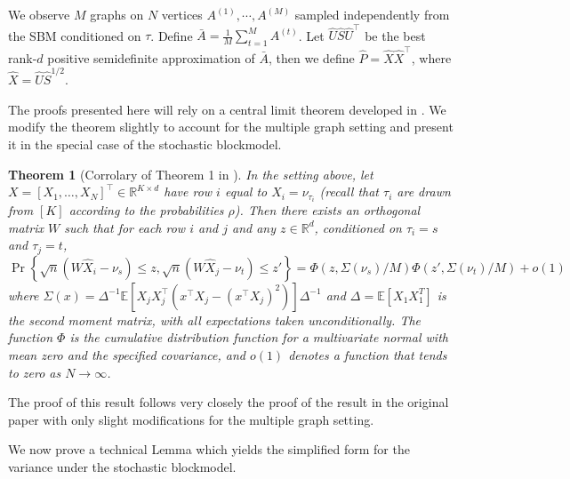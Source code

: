 \documentclass[10pt,letterpaper]{article}
\newtheorem{theorem}[fact]{Theorem}
\renewcommand{\Re}{\mathbb{R}}
\newcommand{\Ex}{\mathbb{E}}
\renewcommand{\hat}{\widehat}
\begin{document}
We observe $M$ graphs on $N$ vertices $A^{(1)}, \cdots, A^{(M)}$ sampled independently from the SBM conditioned on $\tau$.
Define $\bar{A} = \frac{1}{M} \sum_{t=1}^M A^{(t)}$. Let $\hat{U} \hat{S} \hat{U}^{\top}$ be the best rank-$d$ positive semidefinite approximation of $\bar{A}$, then we define $\hat{P} = \hat{X} \hat{X}^{\top}$, where $\hat{X} = \hat{U} \hat{S}^{1/2}$.




The proofs presented here will rely on a central limit theorem developed in \citet{athreya2013limit}. 
We modify the theorem slightly to account for the multiple graph setting and present it in the special case of the stochastic blockmodel.

\begin{theorem}[Corrolary of Theorem 1 in \citet{athreya2013limit}]\label{thm:clt_ext}
  In the setting above, let $X=[X_1,\dotsc,X_N]^{\top}\in\Re^{K\times d}$ have row $i$ equal to $X_i=\nu_{\tau_i}$ (recall that $\tau_i$ are drawn from $[K]$ according to the probabilities $\rho$).
	Then there exists an orthogonal matrix $W$ such that for each row $i$ and $j$ and any $z \in \Re^{d}$, conditioned on $\tau_i=s$ and $\tau_j=t$,
  \begin{equation}
    \label{eq:4}
    \Pr\left\{\sqrt{n}( W \hat{X}_i - \nu_s ) \leq z, \sqrt{n}( W \hat{X}_j - \nu_t) \leq z'\right\}
=  \Phi(z, \Sigma(\nu_s)/M)  \Phi(z', \Sigma(\nu_t)/M) +o(1)
  \end{equation}
  where $\Sigma(x) =\Delta^{-1}\Ex[ X_j X_j^\top(x^\top X_j -(x^\top
  X_j)^2)]\Delta^{-1}$ and $\Delta=\Ex[ X_1 X_{1}^{T}]$ is the second
  moment matrix, with all expectations taken unconditionally.
  The function $\Phi$ is the cumulative distribution function for a multivariate normal with mean zero and the specified covariance, and $o(1)$ denotes a function that tends to zero as $N\to \infty$.
\end{theorem}
The proof of this result follows very closely the proof of the result in the original paper with only slight modifications for the multiple graph setting.

We now prove a technical Lemma which yields the simplified form for the variance under the stochastic blockmodel.
\end{document}

